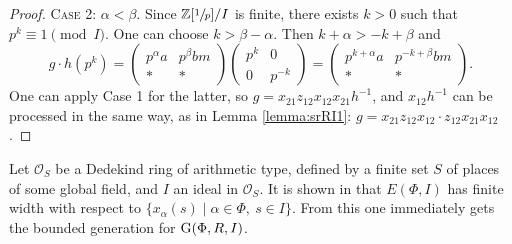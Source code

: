 \begin{proof}
\textsc{Case 2:} $\alpha<\beta$. Since $\mathbb{Z}[\sfrac{1}{p}]/I$ is finite, there exists $k>0$ such that $p^k\equiv 1\pmod I$. One can choose $k>\beta-\alpha$. Then $k+\alpha>-k+\beta$ and
\[ g\cdot h\left(p^k\right) =
\begin{pmatrix} p^\alpha a & p^\beta bm \\ * & * \end{pmatrix}
\begin{pmatrix} p^k & 0 \\ 0 & p^{-k} \end{pmatrix}=
\begin{pmatrix} p^{k+\alpha} a & p^{-k+\beta} bm \\ * & * \end{pmatrix}.
\]
One can apply Case 1 for the latter, so
$g=x_{21}z_{12}x_{12}x_{21}h^{-1}$,
and $x_{12}h^{-1}$ can be processed in the same way, as in Lemma \ref{lemma:srRI1}:
$g=x_{21}z_{12}x_{12}\cdot z_{12}x_{21}x_{12}$.
\end{proof}
Let $\mathcal{O}_S$ be a Dedekind ring of arithmetic type, defined by a finite set $S$ of places of some global field, and $I$ an ideal in $\mathcal{O}_S$. It is shown in \cite{TavgenThesis} that $E(\Phi,I)$ has finite width with respect to $\{x_\alpha(s)\mid\alpha\in\Phi,\ s\in I\}$. From this one immediately gets the bounded generation for $\operatorname{G}(\Phi,R,I)$.

